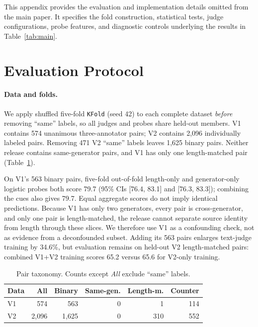 This appendix provides the evaluation and implementation details omitted from the main paper. It specifies the fold construction, statistical tests, judge configurations, probe features, and diagnostic controls underlying the results in Table~\ref{tab:main}.

\section{Evaluation Protocol}
\label{app:evaluation}

\paragraph{Data and folds.}
We apply shuffled five-fold \texttt{KFold} (seed 42) to each complete dataset \emph{before} removing ``same'' labels, so all judges and probes share held-out members. V1 contains 574 unanimous three-annotator pairs; V2 contains 2,096 individually labeled pairs. Removing 471 V2 ``same'' labels leaves 1,625 binary pairs. Neither release contains same-generator pairs, and V1 has only one length-matched pair (Table~\ref{tab:taxonomy}).

On V1's 563 binary pairs, five-fold out-of-fold length-only and generator-only logistic probes both score 79.7 \waf (95\% CIs [76.4, 83.1] and [76.3, 83.3]); combining the cues also gives 79.7. Equal aggregate scores do not imply identical predictions. Because V1 has only two generators, every pair is cross-generator, and only one pair is length-matched, the release cannot separate source identity from length through these slices. We therefore use V1 as a confounding check, not as evidence from a deconfounded subset. Adding its 563 pairs enlarges text-judge training by 34.6\%, but evaluation remains on held-out V2 length-matched pairs: combined V1+V2 training scores 65.2 versus 65.6 for V2-only training.

\begin{table}[t]
  \centering
  \caption{Pair taxonomy. Counts except \emph{All} exclude ``same'' labels.}
  \label{tab:taxonomy}
  \begin{tabular}{lrrrrr}
    \toprule
    Data & All & Binary & Same-gen. & Length-m. & Counter \\
    \midrule
    V1 & 574 & 563 & 0 & 1 & 114 \\
    V2 & 2,096 & 1,625 & 0 & 310 & 552 \\
    \bottomrule
  \end{tabular}
\end{table}

